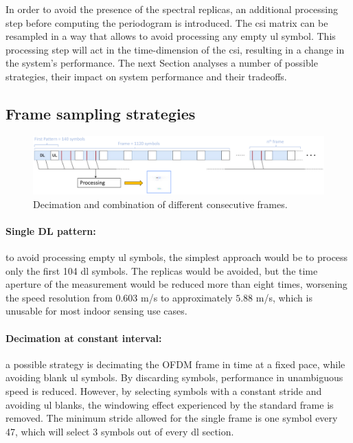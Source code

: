 			In order to avoid the presence of the spectral replicas, an additional processing step before computing the periodogram is introduced.
			The \gls{csi} matrix can be resampled in a way that allows to avoid processing any empty \gls{ul} symbol.
			This processing step will act in the time-dimension of the \gls{csi}, resulting in a change in the system's performance.
			The next Section analyses a number of possible strategies, their impact on system performance and their tradeoffs.    

	\subsection{Frame sampling strategies}

		    \begin{figure}[H]
		        \centering
		        \includegraphics[width=1\textwidth]{Images/TDDprocessing/TDDstrategies.eps}
		        \caption{Decimation and combination of different consecutive frames. }
		        \label{fig:TDDstrategies}
		    \end{figure}
		
		    \paragraph{Single DL pattern:}
		    to avoid processing empty \gls{ul} symbols, the simplest approach would be to process only the first 104 \gls{dl} symbols. The replicas would be avoided, but the time aperture of the measurement would be reduced more than eight times, worsening the speed resolution from $0.603$ m/s to approximately $5.88$ m/s, which is unusable for most indoor sensing use cases.
		    
		    \paragraph{Decimation at constant interval:}
		     a possible strategy is decimating the OFDM frame in time at a fixed pace, while avoiding blank \gls{ul} symbols. 
		     By discarding symbols, performance in unambiguous speed is reduced. However, by selecting symbols with a constant stride and avoiding \gls{ul} blanks, the windowing effect experienced by the standard frame is removed.
		     The minimum stride allowed for the single frame is one symbol every 47, which will select 3 symbols out of every \gls{dl} section.
		     
